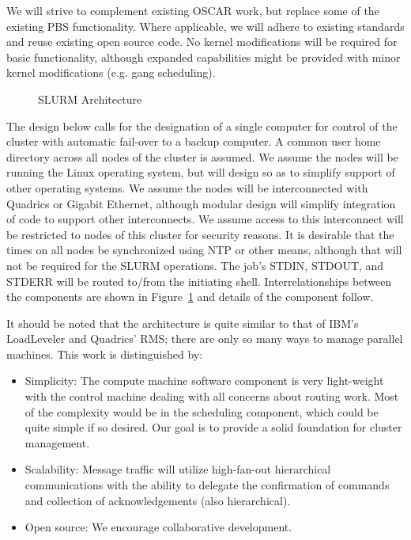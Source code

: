 We will strive to complement existing OSCAR work, but replace some of the
existing PBS functionality. Where applicable, we will adhere to existing
standards and reuse existing open source code. No kernel modifications will be
required for basic functionality, although expanded capabilities might be
provided with minor kernel modifications (e.g. gang scheduling). 

\begin{figure}
\caption{SLURM Architecture}
\label{arch}
\end{figure}
The design below calls for the designation of a single computer for control of
the cluster with automatic fail-over to a backup computer. A common user home
directory across all nodes of the cluster is assumed. We assume the nodes will
be running the Linux operating system, but will design so as to simplify
support of other operating systems. We assume the nodes will be interconnected
with Quadrics or Gigabit Ethernet, although modular design will simplify
integration of code to support other interconnects. We assume access to this
interconnect will be restricted to nodes of this cluster for security reasons.
It is desirable that the times on all nodes be synchronized using NTP or other
means, although that will not be required for the SLURM operations. The job's
STDIN, STDOUT, and STDERR will be routed to/from the initiating shell.
Interrelationships between the components are shown in Figure~\ref{arch}
and details of the component follow. 

It should be noted that the architecture is quite similar to that of IBM's
LoadLeveler and Quadrics' RMS; there are only so many ways to manage parallel
machines. This work is distinguished by:
\begin{itemize}
\item Simplicity: The compute machine software component is very light-weight with
the control machine dealing with all concerns about routing work. Most of the
complexity would be in the scheduling component, which could be quite simple if
so desired. Our goal is to provide a solid foundation for cluster management.
\item Scalability: Message traffic will utilize high-fan-out hierarchical
communications with the ability to delegate the confirmation of commands and
collection of acknowledgements (also hierarchical).
\item Open source: We encourage collaborative development.
\end{itemize}

